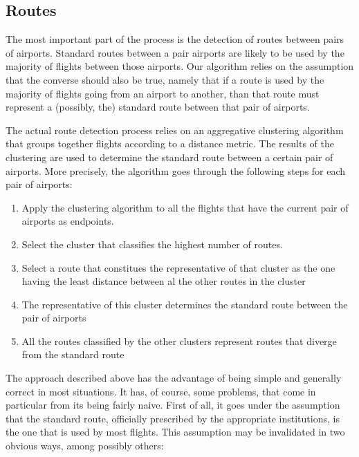 \documentclass{vldb}
\begin{document}
\subsection{Routes}

The most important part of the process is the detection of routes between pairs
of airports. Standard routes between a pair airports are likely to be used by
the majority of flights between those airports. Our algorithm relies on the
assumption that the converse should also be true, namely that if a route is used
by the majority of flights going from an airport to another, than that route
must represent a (possibly, the) standard route between that pair of airports.

The actual route detection process relies on an aggregative clustering algorithm
that groups together flights according to a distance metric. The results of the
clustering are used to determine the standard route between a certain pair of
airports. More precisely, the algorithm goes through the following steps for
each pair of airports:

\begin{enumerate}
  \item Apply the clustering algorithm to all the flights that have the
  current pair of airports as endpoints.
  \item Select the cluster that classifies the highest number of routes.
  \item Select a route that constitues the representative of
  that cluster as the one having the least distance between al the other
  routes in the cluster
  \item The representative of this cluster determines the standard route
  between the pair of airports
  \item All the routes classified by the other clusters represent routes that
  diverge from the standard route
\end{enumerate}

The approach described above has the advantage of being simple and generally
correct in most situations. It has, of course, some problems, that come in
particular from its being fairly naive. First of all, it goes under the
assumption that the standard route, officially prescribed by the
appropriate institutions, is the one that is used by most flights. This
assumption may be invalidated in two obvious ways, among possibly others:
\end{document}
